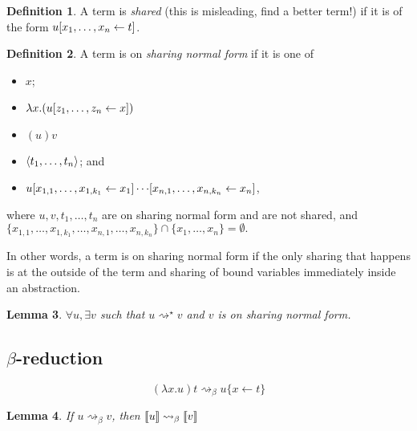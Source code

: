 \documentclass[11pt,a4paper]{article}
\theoremstyle{definition}
\newtheorem{definition}{Definition}
\theoremstyle{plain}
\newtheorem{lemma}[definition]{Lemma}
\theoremstyle{remark}
\begin{document}
\begin{definition}
A term is \emph{shared} (this is misleading, find a better term!) if it is of the form ${{u}[{x_1},\dots,{x_n}\leftarrow{t}]}$.
\end{definition}

\begin{definition}
A term is on \emph{sharing normal form} if it is one of
\begin{itemize}
	\item $x$;
	\item $\lambda x.({{u}[{z_1},\dots,{z_n}\leftarrow{x}]})$
	\item $(u)v$
	\item ${\langle{t_1},\dots,{t_n}{\rangle}}$; and
	\item ${{{{u}[{x_{1,1}},\dots,{x_{1,k_1}}\leftarrow{x_1}]}\cdots}[{x_{n,1}},\dots,{x_{n,k_n}}\leftarrow{x_n}]}$,
\end{itemize}
where $u,v,t_1,\dots,t_n$ are on sharing normal form and are not shared, and $\{x_{1,1},\dots,x_{1,k_1},\dots,x_{n,1},\dots,x_{n,k_n}\}\cap\{x_1,\dots,x_n\}=\emptyset.$
\end{definition}

In other words, a term is on sharing normal form if the only sharing that happens is at the outside of the term and sharing of bound variables immediately inside an abstraction.

\begin{lemma}
$\forall u, \exists v$ such that $u\rightsquigarrow^\star v$ and $v$ is on sharing normal form.
\end{lemma}

\subsection{$\beta$-reduction}

\[
(\lambda x.u)t \rightsquigarrow_\beta u\{x\leftarrow t\}
\]

\begin{lemma}
	If $u\rightsquigarrow_\beta v$, then ${\llbracket{u}\rrbracket}\rightsquigarrow_\beta{\llbracket{v}\rrbracket}$
\end{lemma}

\end{document}
